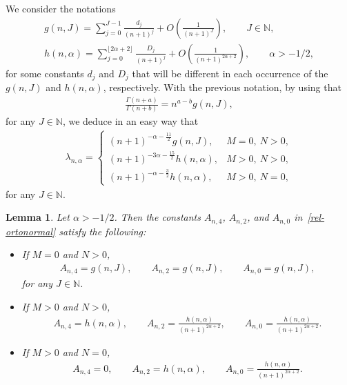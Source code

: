 \documentclass[11pt]{article}
\newtheorem{lem}[thm]{Lemma}
\numberwithin{equation}{section}
\begin{document}
We consider the notations
\begin{gather*}%
g(n,J)=\sum_{j=0}^{J-1}\frac{d_j}{(n+1)^{j}}+O\left(\frac{1}{(n+1)^J}\right), \qquad J\in \mathbb{N},\\
h(n,\alpha)=\sum_{j=0}^{\lfloor 2\alpha+2 \rfloor}\frac{D_j}{(n+1)^{j}}+O\left(\frac{1}{(n+1)^{2\alpha+2}}\right), \qquad \alpha>-1/2,
\end{gather*}
for some constants $d_j$ and $D_j$ that will be different in each occurrence of the $g(n,J)$ and $h(n,\alpha)$, respectively. With the previous notation, by using that
\begin{gather}\label{ec:gamma-ratio}
\frac{\Gamma(n+a)}{\Gamma(n+b)}=n^{a-b}g(n,J),
\end{gather}
for any $J\in \mathbb{N}$, we deduce in an easy way that
\begin{gather}\label{lambda_n}
\lambda_{n,\alpha}= \begin{cases}
(n+1)^{-\alpha-\frac{11}{2}}g(n,J), & M=0, \ N>0,\\
(n+1)^{-3\alpha-\frac{15}{2}}h(n,\alpha), & M>0, \ N>0,\\
(n+1)^{-\alpha-\frac{3}{2}}h(n,\alpha), & M>0, \ N=0,
\end{cases}
\end{gather}
for any $J\in \mathbb{N}$.

\begin{lem}\label{A_nB_nC_n} Let $\alpha>-1/2$. Then the constants $A_{n,4}$, $A_{n,2}$, and $A_{n,0}$ in~\eqref{rel-ortonormal} satisfy the following:
	\begin{itemize}\itemsep=0pt
		\item [$i)$] If $M=0$ and $N>0$,
		\begin{gather*}
		A_{n,4}=g(n,J),\qquad A_{n,2}= g(n,J),\qquad A_{n,0}= g(n,J),
		\end{gather*}
for any $J\in \mathbb{N}$.
		\item [$ii)$] If $M>0$ and $N>0$,
		\begin{gather*}
		A_{n,4}= h(n,\alpha),\qquad A_{n,2}=\frac{h(n,\alpha)}{(n+1)^{2\alpha+2}},\qquad A_{n,0}=\frac{h(n,\alpha)}{(n+1)^{2\alpha+2}}.
		\end{gather*}
		\item [$iii)$] If $M>0$ and $N=0$,
		\begin{gather*}
		A_{n,4}=0,\qquad A_{n,2}=h(n,\alpha),\qquad A_{n,0}=\frac{h(n,\alpha)}{(n+1)^{2\alpha+2}}.
		\end{gather*}
	\end{itemize}
\end{lem}
\end{document}
